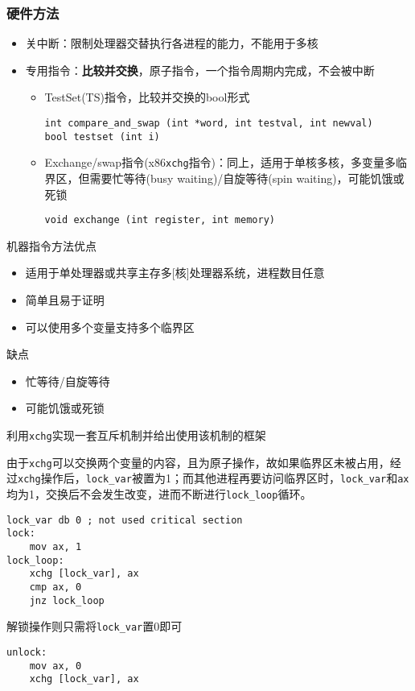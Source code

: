 \subsubsection{硬件方法}
\begin{itemize}
    \item 关中断：限制处理器交替执行各进程的能力，不能用于多核
    \item 专用指令：\textbf{比较并交换}，原子指令，一个指令周期内完成，不会被中断
    \begin{itemize}
        \item TestSet(TS)指令，比较并交换的bool形式
\begin{lstlisting}
int compare_and_swap (int *word, int testval, int newval)
bool testset (int i)
\end{lstlisting}
        \item Exchange/swap指令(x86\verb'xchg'指令)：同上，适用于单核多核，多变量多临界区，但需要忙等待(busy waiting)/自旋等待(spin waiting)，可能饥饿或死锁
\begin{lstlisting}
void exchange (int register, int memory)
\end{lstlisting}
    \end{itemize}
\end{itemize}

机器指令方法优点
\begin{itemize}
    \item 适用于单处理器或共享主存多[核]处理器系统，进程数目任意
    \item 简单且易于证明
    \item 可以使用多个变量支持多个临界区
\end{itemize}
缺点
\begin{itemize}
    \item 忙等待/自旋等待
    \item 可能饥饿或死锁
\end{itemize}

\begin{example}
    利用\verb'xchg'实现一套互斥机制并给出使用该机制的框架
\end{example}
\begin{analysis}
    由于\verb'xchg'可以交换两个变量的内容，且为原子操作，故如果临界区未被占用，经过\verb'xchg'操作后，\verb'lock_var'被置为1；而其他进程再要访问临界区时，\verb'lock_var'和\verb'ax'均为1，交换后不会发生改变，进而不断进行\verb'lock_loop'循环。
\begin{lstlisting}[language={[x86masm]Assembler}]
    lock_var db 0 ; not used critical section
lock:
    mov ax, 1
lock_loop:
    xchg [lock_var], ax
    cmp ax, 0
    jnz lock_loop
\end{lstlisting}
    解锁操作则只需将\verb'lock_var'置0即可
\begin{lstlisting}[language={[x86masm]Assembler}]
unlock:
    mov ax, 0
    xchg [lock_var], ax
\end{lstlisting}
\end{analysis}

